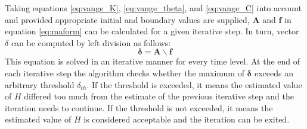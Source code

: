 Taking equations \eqref{eq:vange_K}, \eqref{eq:vange_theta}, and \eqref{eq:vange_C} into account and provided appropriate initial and boundary values are supplied, $\mathbf{A}$ and $\mathbf{f}$ in equation \eqref{eq:maform} can be calculated for a given iterative step.  In turn, vector $\delta$ can be computed by left division as follows:
\begin{equation}
  \label{eq:maform_ledi}
  \boldsymbol{\delta} = \mathbf{A \backslash f}
\end{equation}
This equation is solved in an iterative manner for every time level.  At the end of each iterative step the algorithm checks whether the maximum of $\boldsymbol{\delta}$ exceeds an arbitrary threshold $\delta_{th}$.
If the threshold is exceeded, it means the estimated value of $H$ differed too much from the estimate of the previous iterative step and the iteration needs to continue.
If the threshold is not exceeded, it means the estimated value of $H$ is considered acceptable and the iteration can be exited.

